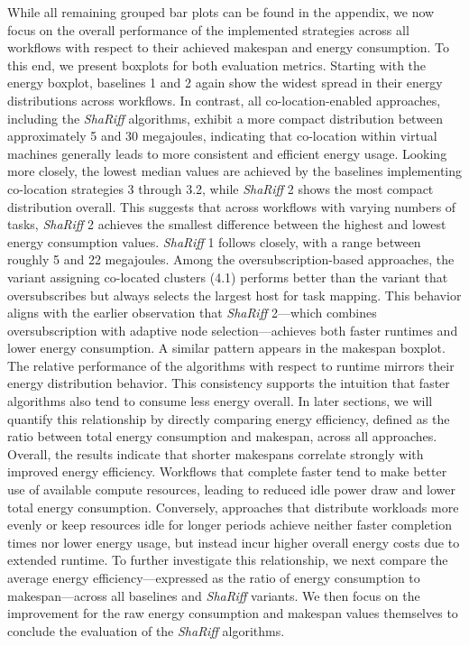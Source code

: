 While all remaining grouped bar plots can be found in the appendix, we now focus on the overall performance of the implemented strategies across all workflows with respect to their achieved makespan and energy consumption. To this end, we present boxplots for both evaluation metrics.
Starting with the energy boxplot, baselines 1 and 2 again show the widest spread in their energy distributions across workflows. In contrast, all co-location-enabled approaches, including the \textit{ShaRiff} algorithms, exhibit a more compact distribution between approximately 5 and 30 megajoules, indicating that co-location within virtual machines generally leads to more consistent and efficient energy usage. Looking more closely, the lowest median values are achieved by the baselines implementing co-location strategies 3 through 3.2, while \textit{ShaRiff} 2 shows the most compact distribution overall. This suggests that across workflows with varying numbers of tasks, \textit{ShaRiff} 2 achieves the smallest difference between the highest and lowest energy consumption values. \textit{ShaRiff} 1 follows closely, with a range between roughly 5 and 22 megajoules. Among the oversubscription-based approaches, the variant assigning co-located clusters (4.1) performs better than the variant that oversubscribes but always selects the largest host for task mapping. This behavior aligns with the earlier observation that \textit{ShaRiff} 2—which combines oversubscription with adaptive node selection—achieves both faster runtimes and lower energy consumption.
A similar pattern appears in the makespan boxplot. The relative performance of the algorithms with respect to runtime mirrors their energy distribution behavior. This consistency supports the intuition that faster algorithms also tend to consume less energy overall. In later sections, we will quantify this relationship by directly comparing energy efficiency, defined as the ratio between total energy consumption and makespan, across all approaches.
Overall, the results indicate that shorter makespans correlate strongly with improved energy efficiency. Workflows that complete faster tend to make better use of available compute resources, leading to reduced idle power draw and lower total energy consumption. Conversely, approaches that distribute workloads more evenly or keep resources idle for longer periods achieve neither faster completion times nor lower energy usage, but instead incur higher overall energy costs due to extended runtime.
To further investigate this relationship, we next compare the average energy efficiency—expressed as the ratio of energy consumption to makespan—across all baselines and \textit{ShaRiff} variants. We then focus on the improvement for the raw energy consumption and makespan values themselves to conclude the evaluation of the \textit{ShaRiff} algorithms.
